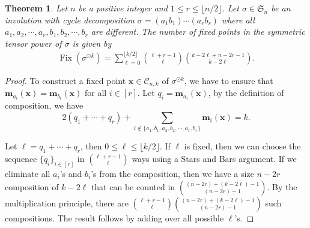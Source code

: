 \documentclass[12pt]{amsart}
\newtheorem{theorem}{Theorem}[section]
\newcommand{\fix}{\operatorname{Fix}}
\begin{document}
\begin{theorem}
    \label{theo:FixedInvoGeneral}
    Let $n$ be a positive integer and $1\leq r\leq \lfloor n/2\rfloor$. Let $\sigma \in \mathfrak{S}_n$ be an involution with cycle decomposition $\sigma = (a_1b_1)\cdots (a_rb_r)$ where all $a_1,a_2,\cdots ,a_r,b_1,b_2,\cdots ,b_r$ are different. The number of fixed points in the symmetric tensor power of $\sigma$ is given by 
    \begin{align}
    \label{eq:FixInvo}
        \fix \left ( \sigma ^ {\odot k}\right ) = \sum _{\ell = 0}^{\lfloor k/2 \rfloor}\binom{\ell +r -1}{\ell}\binom{k-2\ell+n-2r-1}{k-2\ell}.
    \end{align}
\end{theorem}
\begin{proof}
    To construct a fixed point $\textbf{x}\in \mathcal{C}_{n,k}$ of $\sigma ^{\odot k}$, we have to ensure that $\textbf{m}_{a_i}(\textbf{x}) = \textbf{m}_{b_i}(\textbf{x})$ for all $i\in [r]$. Let $q_i = \textbf{m}_{a_i}(\textbf{x})$, by the definition of composition, we have $$2(q_1+\cdots +q_r) +\sum _{i \not \in \{a_1,b_1,a_2,b_2,\cdots ,a_r,b_r\}}\textbf{m}_{i}(\textbf{x}) = k.$$
    
    Let $\ell = q_1+\cdots +q_r$, then $0\leq \ell \leq \lfloor k/2\rfloor$. If $\ell$ is fixed, then we can choose the sequence $\{q_i\}_{i\in [r]}$ in $\binom{\ell +r -1}{\ell}$ ways using a Stars and Bars argument. If we eliminate all $a_i$'s and $b_i$'s from the composition, then we have a size $n-2r$ composition of $k-2\ell$ that can be counted in $\binom{(n-2r)+(k-2\ell)-1}{(n-2r)-1}$. By the multiplication principle,  there are $\binom{\ell +r -1}{\ell}\binom{(n-2r)+(k-2\ell)-1}{(n-2r)-1}$ such compositions. The result follows by adding over all possible $\ell$'s.
\end{proof}
\end{document}
